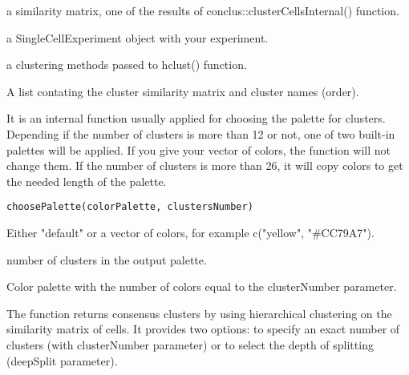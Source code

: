 \documentclass[a4paper]{book}
\begin{document}
%
\begin{Arguments}
\begin{ldescription}
\item[\code{cellsSimilarityMatrix}] a similarity matrix, one of the results of conclus::clusterCellsInternal() function.

\item[\code{sceObject}] a SingleCellExperiment object with your experiment.

\item[\code{clusteringMethod}] a clustering methods passed to hclust() function.
\end{ldescription}
\end{Arguments}
%
\begin{Value}
A list contating the cluster similarity matrix and cluster names (order).
\end{Value}
%
\begin{Description}\relax
It is an internal function usually applied for choosing the palette for clusters.
Depending if the number of clusters is more than 12 or not, one of two built-in palettes will be applied.
If you give your vector of colors, the function will not change them.
If the number of clusters is more than 26, it will copy colors to get the needed length of the palette.
\end{Description}
%
\begin{Usage}
\begin{verbatim}
choosePalette(colorPalette, clustersNumber)
\end{verbatim}
\end{Usage}
%
\begin{Arguments}
\begin{ldescription}
\item[\code{colorPalette}] Either "default" or a vector of colors, for example c("yellow", "\#CC79A7").

\item[\code{clustersNumber}] number of clusters in the output palette.
\end{ldescription}
\end{Arguments}
%
\begin{Value}
Color palette with the number of colors equal to the clusterNumber parameter.
\end{Value}
%
\begin{Description}\relax
The function returns consensus clusters by using hierarchical clustering on the similarity matrix of cells.
It provides two options: to specify an exact number of clusters (with clusterNumber parameter)
or to select the depth of splitting (deepSplit parameter).
\end{Description}
\end{document}
